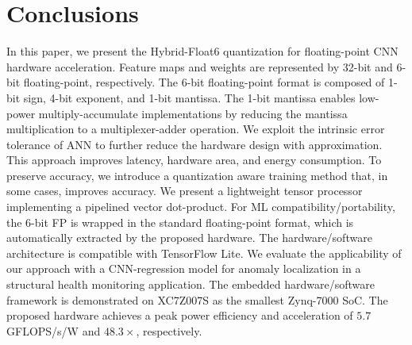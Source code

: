 \section{Conclusions}
\label{sec:conclusions}
In this paper, we present the Hybrid-Float6 quantization for floating-point CNN hardware acceleration. Feature maps and weights are represented by 32-bit and 6-bit floating-point, respectively. The 6-bit floating-point format is composed of 1-bit sign, 4-bit exponent, and 1-bit mantissa. The 1-bit mantissa enables low-power multiply-accumulate implementations by reducing the mantissa multiplication to a multiplexer-adder operation. We exploit the intrinsic error tolerance of ANN to further reduce the hardware design with approximation. This approach improves latency, hardware area, and energy consumption. To preserve accuracy, we introduce a quantization aware training method that, in some cases, improves accuracy. We present a lightweight tensor processor implementing a pipelined vector dot-product. For ML compatibility/portability, the 6-bit FP is wrapped in the standard floating-point format, which is automatically extracted by the proposed hardware. The hardware/software architecture is compatible with TensorFlow Lite. We evaluate the applicability of our approach with a CNN-regression model for anomaly localization in a structural health monitoring application. The embedded hardware/software framework is demonstrated on XC7Z007S as the smallest Zynq-7000 SoC. The proposed hardware achieves a peak power efficiency and acceleration of $5.7$ GFLOPS/s/W and $48.3\times$, respectively.